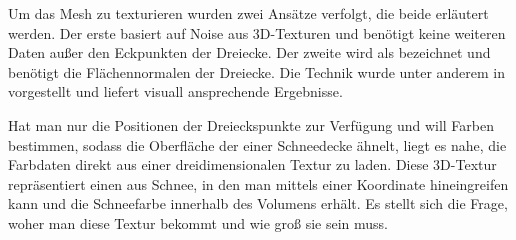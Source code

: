 Um das Mesh zu texturieren wurden zwei Ansätze verfolgt, die beide
erläutert werden. Der erste basiert auf Noise aus 3D-Texturen und
benötigt keine weiteren Daten außer den Eckpunkten der Dreiecke. Der
zweite wird als  bezeichnet
und benötigt die Flächennormalen der Dreiecke. Die Technik wurde unter
anderem in \cite{Nguyen:2007:GG:1407436} vorgestellt und liefert
visuall ansprechende Ergebnisse.

Hat man nur die Positionen der Dreieckspunkte zur Verfügung und will
Farben bestimmen, sodass die Oberfläche der einer Schneedecke ähnelt,
liegt es nahe, die Farbdaten direkt aus einer dreidimensionalen Textur
zu laden. Diese 3D-Textur repräsentiert einen 
aus Schnee, in den man mittels einer Koordinate hineingreifen kann und
die Schneefarbe innerhalb des Volumens erhält. Es stellt sich die
Frage, woher man diese Textur bekommt und wie groß sie sein muss.

